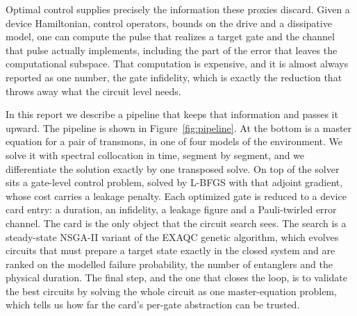\documentclass[10pt]{article}
\begin{document}
Optimal control supplies precisely the information these proxies discard.
Given a device Hamiltonian, control operators, bounds on the drive and a
dissipative model, one can compute the pulse that realizes a target gate and
the channel that pulse actually implements, including the part of the error
that leaves the computational subspace. That computation is expensive, and it
is almost always reported as one number, the gate infidelity, which is exactly
the reduction that throws away what the circuit level needs.

In this report we describe a pipeline that keeps that information and passes
it upward. The pipeline is shown in Figure~\ref{fig:pipeline}. At the bottom is
a master equation for a pair of transmons, in one of four models of the
environment. We solve it with spectral collocation in time, segment by segment,
and we differentiate the solution exactly by one transposed solve. On top of
the solver sits a gate-level control problem, solved by L-BFGS with that
adjoint gradient, whose cost carries a leakage penalty. Each optimized gate is
reduced to a device card entry: a duration, an infidelity, a leakage figure and
a Pauli-twirled error channel. The card is the only object that the circuit
search sees. The search is a steady-state NSGA-II variant of the EXAQC genetic
algorithm, which evolves circuits that must prepare a target state exactly in
the closed system and are ranked on the modelled failure probability, the
number of entanglers and the physical duration. The final step, and the one
that closes the loop, is to validate the best circuits by solving the whole
circuit as one master-equation problem, which tells us how far the card's
per-gate abstraction can be trusted.
\end{document}
